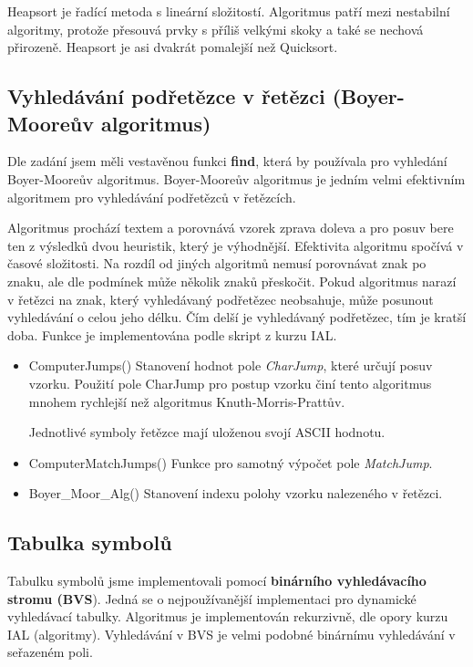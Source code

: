 \documentclass[a4paper, 11pt, titlepage]{article}
\begin{document}
Heapsort je řadící metoda s lineární složitostí. Algoritmus patří mezi nestabilní algoritmy, protože přesouvá prvky s příliš velkými skoky a také se nechová přirozeně. Heapsort je asi dvakrát pomalejší než Quicksort.

\subsection{Vyhledávání podřetězce v řetězci (Boyer-Mooreův algoritmus)}
Dle zadání jsem měli vestavěnou funkci \textbf{find}, která by používala pro vyhledání Boyer-Mooreův algoritmus. Boyer-Mooreův algoritmus je jedním velmi efektivním algoritmem pro vyhledávání podřetězců v řetězcích. 

Algoritmus prochází textem a porovnává vzorek zprava doleva a pro posuv bere ten z výsledků dvou heuristik,
který je výhodnější. Efektivita algoritmu spočívá v časové složitosti. Na rozdíl od jiných algoritmů nemusí porovnávat znak po znaku, ale dle podmínek může několik znaků přeskočit. Pokud algoritmus narazí v řetězci na znak, který vyhledávaný podřetězec neobsahuje, může posunout vyhledávání o celou jeho délku. Čím delší je vyhledávaný podřetězec, tím je kratší doba. Funkce je implementována podle skript z kurzu IAL.

\begin{itemize}
	\item ComputerJumps()
	\subitem Stanovení hodnot pole \textit{CharJump}, které určují posuv vzorku. Použití pole CharJump pro postup vzorku činí tento algoritmus mnohem rychlejší než algoritmus Knuth-Morris-Prattův. 
	
	\subitem Jednotlivé symboly řetězce mají uloženou svojí ASCII hodnotu. 
	
	\item ComputerMatchJumps()
	\subitem Funkce pro samotný výpočet pole \textit{MatchJump}.
	
	\item Boyer\_Moor\_Alg()
	\subitem Stanovení indexu polohy vzorku nalezeného v řetězci.
	
\end{itemize}

\subsection{Tabulka symbolů}
Tabulku symbolů jsme implementovali pomocí \textbf{binárního vyhledávacího stromu (BVS}).
Jedná se o nejpoužívanější implementaci pro dynamické vyhledávací tabulky. Algoritmus je implementován rekurzivně, dle opory kurzu IAL (algoritmy). Vyhledávání v BVS je velmi podobné binárnímu vyhledávání v seřazeném poli.  
\end{document}
